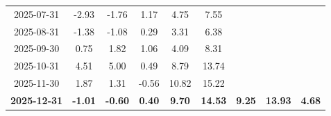 \begin{longtable}{ccccccccc}
2025-07-31 & -2.93 & -1.76 & 1.17 & 4.75 & 7.55 &  &  &  \\
2025-08-31 & -1.38 & -1.08 & 0.29 & 3.31 & 6.38 &  &  &  \\
2025-09-30 & 0.75 & 1.82 & 1.06 & 4.09 & 8.31 &  &  &  \\
2025-10-31 & 4.51 & 5.00 & 0.49 & 8.79 & 13.74 &  &  &  \\
2025-11-30 & 1.87 & 1.31 & -0.56 & 10.82 & 15.22 &  &  &  \\
\textbf{2025-12-31} & \textbf{-1.01} & \textbf{-0.60} & \textbf{0.40} & \textbf{9.70} & \textbf{14.53} & \textbf{9.25} & \textbf{13.93} & \textbf{4.68} \\
\midrule
\bottomrule
\end{longtable}
